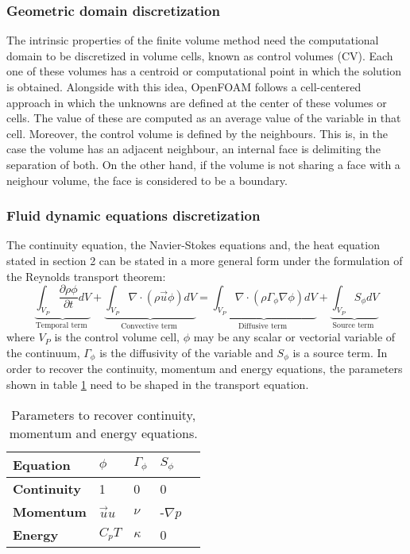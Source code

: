 \subsubsection*{Geometric domain discretization}
The intrinsic properties of the finite volume method need the computational domain to be discretized in volume cells, known as control volumes (CV). Each one of these volumes has a centroid or computational point in which the solution is obtained. 
Alongside with this idea, OpenFOAM follows a cell-centered approach in which the unknowns are defined at the center of these volumes or cells. The value of these are computed as an average value of the variable in that cell.
\newline
Moreover, the control volume is defined by the neighbours. This is, in the case the volume has an adjacent neighbour, an internal face is delimiting the separation of both. On the other hand, if the volume is not sharing a face with a neighour volume, the face is considered to be a boundary.

\subsubsection*{Fluid dynamic equations discretization}
The continuity equation, the Navier-Stokes equations and, the heat equation stated in section 2 can be stated in a more general form under the formulation of the Reynolds transport theorem:
\begin{equation}
\underbrace{\int_{V_{P}} \frac{\partial \rho \phi}{\partial t} d V}_{\text {Temporal term }}+\underbrace{\int_{V_{P}} \nabla \cdot(\rho \vec{u} \phi) d V}_{\text {Convective term }}=\underbrace{\int_{V_{P}} \nabla \cdot\left(\rho \Gamma_{\phi} \nabla \phi\right) d V}_{\text {Diffusive term }}+\underbrace{\int_{V_{P}} S_{\phi} d V}_{\text {Source term }}
\label{3.1}
\end{equation}
where $V_{P}$ is the control volume cell, $\phi$ may be any scalar or vectorial variable of the continuum, $\Gamma_{\phi}$ is the diffusivity of the variable and $S_{\phi}$ is a source term. 
\newline
In order to recover the continuity, momentum and energy equations, the parameters shown in table \ref{fig:transportEq.} need to be shaped in the transport equation.
\begin{table}[h!]
	\begin{tabular}{@{}lllll@{}}
		\toprule[1pt]
		\textbf{Equation} & \textbf{$\phi$} & \textbf{$\Gamma_{\phi}$} & \textbf{$S_{\phi}$}  \\ \midrule[2pt]
		\textbf{Continuity} & 1 & 0 & 0  \\
		\textbf{Momentum} & $\vec{u}u$ & $\nu$ & -$\nabla p$\\
		\textbf{Energy} & $C_{p}T$ & $\kappa$ & 0\\ \bottomrule[1pt]		
	\end{tabular}
	\centering
	\caption{Parameters to recover continuity, momentum and energy equations.}	
	\label{fig:transportEq.}
\end{table}

